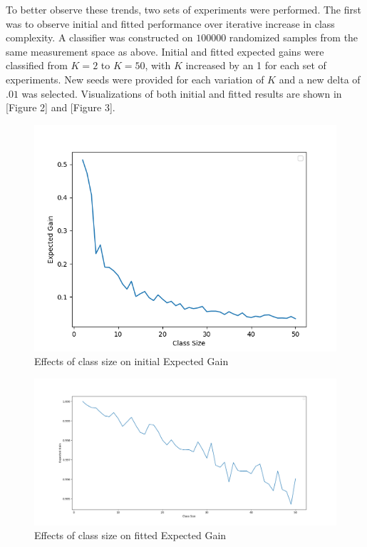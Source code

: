 \documentclass[10pt, conference]{IEEEtran}
\begin{document}
To better observe these trends, two sets of experiments were performed. The first was to observe initial and fitted performance over iterative increase in class complexity. A classifier was constructed on $100000$ randomized samples from the same measurement space as above. Initial and fitted expected gains were classified from $K=2$ to $K=50$, with $K$ increased by an 1 for each set of experiments. New seeds were provided for each variation of $K$ and a new delta of $.01$ was selected. Visualizations of both initial and fitted results are shown in [Figure 2] and [Figure 3]. 
\begin{figure}[htbp]
\centerline{\includegraphics[scale=0.5]{iterativeClassInitial.png}}
\caption{Effects of class size on initial Expected Gain}
\label{fig}
\end{figure}
\begin{figure}[htbp]
\centerline{\includegraphics[scale=0.25]{iterativeClassFitted.png}}
\caption{Effects of class size on fitted Expected Gain}
\label{fig}
\end{figure}
\end{document}

